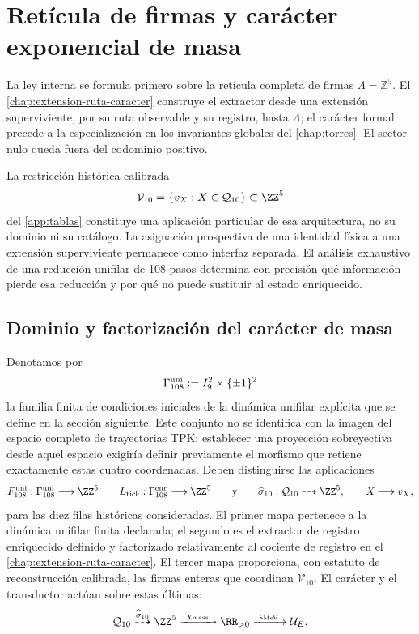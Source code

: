 \chapter{Retícula de firmas y carácter exponencial de masa}
\label{chap:masas}

La ley interna se formula primero sobre la retícula completa de firmas
\(\Lambda=\mathbb Z^5\). El
\cref{chap:extension-ruta-caracter} construye el extractor desde una extensión
superviviente, por su ruta observable y su registro, hasta \(\Lambda\); el
carácter formal precede a la especialización en los invariantes globales del
\cref{chap:torres}. El sector nulo queda fuera del codominio positivo.

La restricción histórica calibrada
\[
 \mathcal V_{10}=\{v_X:X\in\mathcal Q_{10}\}\subset\ZZ^5
\]
del \cref{app:tablas} constituye una aplicación particular de esa arquitectura,
no su dominio ni su catálogo. La asignación prospectiva de una identidad
física a una extensión superviviente permanece como interfaz separada. El
análisis exhaustivo de una reducción unifilar de 108 pasos determina con
precisión qué información pierde esa reducción y por qué no puede sustituir
al estado enriquecido.

\section{Dominio y factorización del carácter de masa}

Denotamos por
\[
 \Gamma_{108}^{\rm uni}
 :=I_9^2\times\{\pm1\}^2
\]
la familia finita de condiciones iniciales de la dinámica unifilar explícita
que se define en la sección siguiente. Este conjunto no se identifica con la
imagen del espacio completo de trayectorias TPK: establecer una proyección
sobreyectiva desde aquel espacio exigiría definir previamente el morfismo que
retiene exactamente estas cuatro coordenadas. Deben distinguirse las
aplicaciones
\[
 F_{108}^{\rm uni}:\Gamma_{108}^{\rm uni}\longrightarrow\ZZ^5
 \qquad
 L_{\rm tick}:\Gamma_{108}^{\rm enr}\longrightarrow\ZZ^5
 \qquad\text{y}\qquad
 \widehat\sigma_{10}:\mathcal Q_{10}\dashrightarrow\ZZ^5,
 \qquad X\longmapsto v_X,
\]
para las diez filas históricas consideradas. El primer mapa pertenece a la dinámica
unifilar finita declarada; el segundo es el extractor de registro enriquecido
definido y factorizado relativamente al cociente de registro en el
\cref{chap:extension-ruta-caracter}. El tercer mapa proporciona, con estatuto
de reconstrucción calibrada, las firmas enteras que coordinan
\(\mathcal V_{10}\). El carácter y el transductor actúan sobre estas últimas:
\[
 \mathcal Q_{10}
 \overset{\widehat\sigma_{10}}{\dashrightarrow}\ZZ^5
 \xrightarrow{\ \chi_{\rm mass}\ }\RR_{>0}
 \xrightarrow{\ \varsigma_{\rm MeV}\ }\mathcal U_E .
\]

